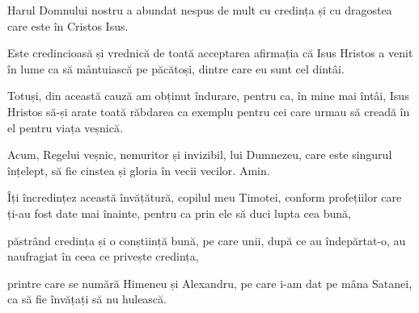 {Harul Domnului nostru a abundat nespus de mult cu credința și cu dragostea care este în Cristos Isus.

Este credincioasă și vrednică de toată acceptarea afirmația că Isus Hristos a venit în lume ca să mântuiască pe păcătoși, dintre care eu sunt cel dintâi.

Totuși, din această cauză am obținut îndurare, pentru ca, în mine mai întâi, Isus Hristos să-și arate toată răbdarea ca exemplu pentru cei care urmau să creadă în el pentru viața veșnică.

Acum, Regelui veșnic, nemuritor și invizibil, lui Dumnezeu, care este singurul înțelept, să fie cinstea și gloria în vecii vecilor. Amin.


\par }{\PP {}Îți încredințez această învățătură, copilul meu Timotei, conform profețiilor care ți-au fost date mai înainte, pentru ca prin ele să duci lupta cea bună,

păstrând credința și o conștiință bună, pe care unii, după ce au îndepărtat-o, au naufragiat în ceea ce privește credința,

printre care se numără Himeneu și Alexandru, pe care i-am dat pe mâna Satanei, ca să fie învățați să nu hulească.



\par }
